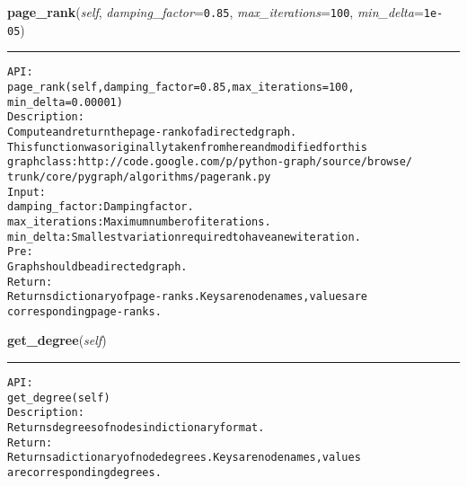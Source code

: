     \label{coinor:gimpy:graph:Graph:page_rank}

    \vspace{0.5ex}

\hspace{.8\funcindent}\begin{boxedminipage}{\funcwidth}

    \raggedright \textbf{page\_rank}(\textit{self}, \textit{damping\_factor}={\tt 0.85}, \textit{max\_iterations}={\tt 100}, \textit{min\_delta}={\tt 1e-05})

    \vspace{-1.5ex}

    \rule{\textwidth}{0.5\fboxrule}
\setlength{\parskip}{2ex}
\begin{alltt}

API:
    page\_rank(self, damping\_factor=0.85, max\_iterations=100,
          min\_delta=0.00001)
Description:
    Compute and return the page-rank of a directed graph.
    This function was originally taken from here and modified for this
    graph class: http://code.google.com/p/python-graph/source/browse/
    trunk/core/pygraph/algorithms/pagerank.py
Input:
    damping\_factor: Damping factor.
    max\_iterations: Maximum number of iterations.
    min\_delta: Smallest variation required to have a new iteration.
Pre:
    Graph should be a directed graph.
Return:
    Returns dictionary of page-ranks. Keys are node names, values are
    corresponding page-ranks.
\end{alltt}

\setlength{\parskip}{1ex}
    \end{boxedminipage}

    \label{coinor:gimpy:graph:Graph:get_degree}

    \vspace{0.5ex}

\hspace{.8\funcindent}\begin{boxedminipage}{\funcwidth}

    \raggedright \textbf{get\_degree}(\textit{self})

    \vspace{-1.5ex}

    \rule{\textwidth}{0.5\fboxrule}
\setlength{\parskip}{2ex}
\begin{alltt}

API:
    get\_degree(self)
Description:
    Returns degrees of nodes in dictionary format.
Return:
    Returns a dictionary of node degrees. Keys are node names, values
    are corresponding degrees.
\end{alltt}

\setlength{\parskip}{1ex}
    \end{boxedminipage}

